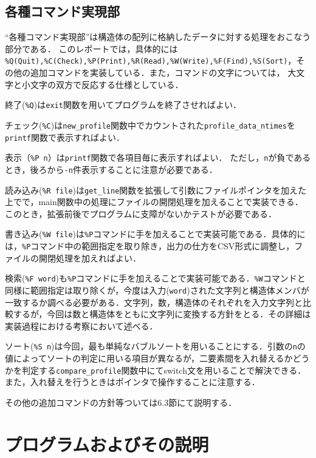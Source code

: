 \documentclass[a4paper,11pt]{jarticle}
\begin{document}
\subsection{各種コマンド実現部} \label{sec:command}

``各種コマンド実現部''は構造体の配列に格納したデータに対する処理をおこなう部分である．
このレポートでは，具体的には\verb| %Q(Quit),%C(Check),%P(Print),%R(Read),%W(Write),%F(Find),%S(Sort)|，その他の追加コマンドを実装している．また，コマンドの文字については，
大文字と小文字の双方で反応する仕様としている．

終了(\verb|%Q|)は\verb|exit|関数を用いてプログラムを終了させればよい．

チェック(\verb|%C|)は\verb|new_profile|関数中でカウントされた\verb|profile_data_ntimes|を\verb|printf|関数で表示すればよい．

表示（\verb|%P n|）は\verb|printf|関数で各項目毎に表示すればよい．
ただし，\verb|n|が負であるとき，後ろから\verb|-n|件表示することに注意が必要である．

読み込み(\verb|%R file|)は\verb|get_line|関数を拡張して引数にファイルポインタを加えた上でで，main関数中の処理にファイルの開閉処理を加えることで実装できる．このとき，拡張前後でプログラムに支障がないかテストが必要である．

書き込み(\verb|%W file|)は\verb|%P|コマンドに手を加えることで実装可能である．具体的には，\verb|%P|コマンド中の範囲指定を取り除き，出力の仕方をCSV形式に調整し，ファイルの開閉処理を加えればよい．

検索(\verb|%F word|)も\verb|%P|コマンドに手を加えることで実装可能である．\verb|%W|コマンドと同様に範囲指定は取り除くが，今度は入力(\verb|word|)された文字列と構造体メンバが一致するか調べる必要がある．文字列，数，構造体のそれぞれを入力文字列と比較するが，今回は数と構造体をともに文字列に変換する方針をとる．その詳細は実装過程における考察において述べる．

ソート(\verb|%S n|)は今回，最も単純なバブルソートを用いることにする．引数の\verb|n|の値によってソートの判定に用いる項目が異なるが，二要素間を入れ替えるかどうかを判定する\verb|compare_profile|関数中にてswitch文を用いることで解決できる．また，入れ替えを行うときはポインタで操作することに注意する．

その他の追加コマンドの方針等ついては$6.3$節にて説明する．

\section{プログラムおよびその説明}
\end{document}
